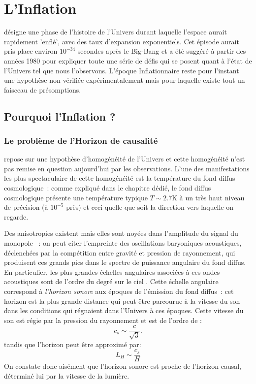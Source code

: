 \chapter{L'Inflation}
 désigne une phase de l'histoire de l'Univers durant laquelle l'espace aurait rapidement 'enflé', avec des taux d'expansion exponentiels. Cet épisode aurait pris place environ $10^{-34}$ secondes après le Big-Bang et a été suggéré à partir des années 1980 pour expliquer toute une série de défis qui se posent quant à l'état de l'Univers tel que nous l'observons. L'époque Inflationnaire reste pour l'instant une hypothèse non vérifiée expérimentalement mais pour laquelle existe tout un faisceau de présomptions.

\section{Pourquoi l'Inflation ?}
\subsection{Le problème de l'Horizon de causalité}
 repose sur une hypothèse d'homogénéité de l'Univers et cette homogénéité n'est pas remise en question aujourd'hui par les observations. L'une des manifestations les plus spectaculaire de cette homogénéité est la température du fond diffus cosmologique~: comme expliqué dans le chapitre dédié, le fond diffus cosmologique présente une température typique $T\sim 2.7 $K à un très haut niveau de précision (à $10^{-5}$ près) et ceci quelle que soit la direction vers laquelle on regarde. 

Des anisotropies existent mais elles sont noyées dans l'amplitude du signal du monopole~ : on peut citer l'empreinte des oscillations baryoniques acoustiques, déclenchées par la compétition entre gravité et pression de rayonnement, qui produisent ces grands pics dans le spectre de puissance angulaire du fond diffus. En particulier, les plus grandes échelles angulaires associées à ces ondes acoustiques  sont de l'ordre du degré sur le ciel . Cette échelle angulaire correspond à \textit{l'horizon sonore} aux époques de l'émission du fond diffus~: cet horizon est la plus grande distance qui peut être parcourue à la vitesse du son dans les conditions qui régnaient dans l'Univers à ces époques. Cette vitesse du son est régie par la pression du rayonnement et est de l'ordre de :
\begin{equation}
c_s\sim \frac{c}{\sqrt 3}.
\end{equation}
tandis que l'horizon peut être approximé par:
\begin{equation}
L_H\sim\frac{c_s}{H}
\end{equation}
On constate donc aisément que l'horizon sonore est proche de l'horizon causal, déterminé lui par la vitesse de la lumière.

